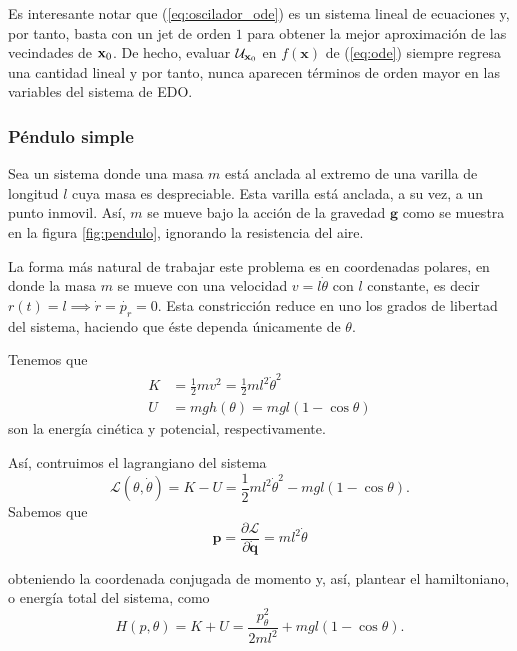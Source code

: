 Es interesante notar que (\ref{eq:oscilador_ode}) es un sistema lineal de ecuaciones y, por tanto, basta con un jet de orden $1$ para obtener la mejor aproximación de las vecindades de $\mathbf{x}_0$. De hecho, evaluar $\mathcal{U}_{\mathbf{x}_0}$ en $f(\mathbf{x})$ de (\ref{eq:ode}) siempre regresa una cantidad lineal y por tanto, nunca aparecen términos de orden mayor en las variables del sistema de EDO.

\subsubsection{Péndulo simple}
\label{sec:pendulo}
Sea un sistema donde una masa $m$ está anclada al extremo de una varilla de longitud $l$ cuya masa es despreciable. Esta varilla está anclada, a su vez, a un punto inmovil. Así, $m$ se mueve bajo la acción de la gravedad $\mathbf{g}$ como se muestra en la figura \ref{fig:pendulo}, ignorando la resistencia del aire.



La forma más natural de trabajar este problema es en coordenadas polares, en donde la masa $m$ se mueve con una velocidad $v = l\dot{\theta}$ con $l$ constante, es decir $r(t) = l \implies \dot{r} = \dot{p_r} = 0$. Esta constricción reduce en uno los grados de libertad del sistema, haciendo que éste dependa únicamente de $\theta$. 

Tenemos que 
\begin{align}
 K &= \frac{1}{2}m v^2 = \frac{1}{2} m l^2 \dot{\theta}^2 \nonumber \\
 U &= mgh(\theta) = mgl\left(1 - \cos{\theta} \right)
\end{align}
son la energía cinética y potencial, respectivamente. 

Así, contruimos el lagrangiano del sistema
\begin{equation*}
 \mathcal{L}(\theta,\dot{\theta}) = K - U = \frac{1}{2} m l^2 \dot{\theta}^2 - mgl\left(1 - \cos{\theta} \right).
\end{equation*}
Sabemos que
\begin{equation*}
 \mathbf{p} = \frac{\partial \mathcal{L}}{\partial \mathbf{\dot{q}}} = ml^2\dot{\theta}
\end{equation*}

obteniendo la coordenada conjugada de momento y, así, plantear el hamiltoniano, o energía total del sistema, como
\begin{equation}
 H(p,\theta) = K + U = \frac{p_{\theta}^2}{2ml^2} + mgl\left(1 - \cos{\theta} \right).
\label{eq:pendulo-ham}
\end{equation}
 
